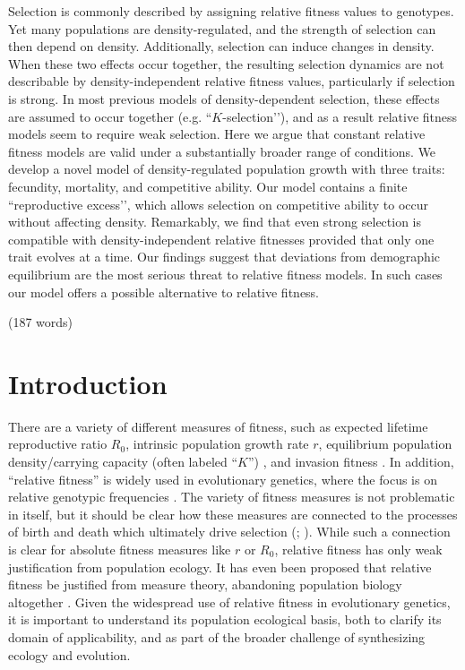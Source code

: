 \documentclass[12pt]{article}
\begin{document}
Selection is commonly described by assigning relative fitness values to genotypes. Yet many populations are density-regulated, and the strength of selection can then depend on density. Additionally, selection can induce changes in density. When these two effects occur together, the resulting selection dynamics are not describable by density-independent relative fitness values, particularly if selection is strong. In most previous models of density-dependent selection, these effects are assumed to occur together (e.g. ``$K$-selection’’), and as a result relative fitness models seem to require weak selection. Here we argue that constant relative fitness models are valid under a substantially broader range of conditions. We develop a novel model of density-regulated population growth with three traits: fecundity, mortality, and competitive ability. Our model contains a finite ``reproductive excess’’, which allows selection on competitive ability to occur without affecting density. Remarkably, we find that even strong selection is compatible with density-independent relative fitnesses provided that only one trait evolves at a time. Our findings suggest that deviations from demographic equilibrium are the most serious threat to relative fitness models. In such cases our model offers a possible alternative to relative fitness. 

\noindent (187 words)

\newpage{}


\section*{Introduction}

There are a variety of different measures of fitness, such as expected lifetime reproductive ratio $R_0$, intrinsic population growth rate $r$, equilibrium population density/carrying capacity (often labeled ``$K$'') \citep{benton_2000}, and invasion fitness \citep{metz_1992}. In addition, ``relative fitness'' is widely used in evolutionary genetics, where the focus is on relative genotypic frequencies \cite[pp. 468]{barton_2007}. The variety of fitness measures is not problematic in itself, but it should be clear how these measures are connected to the processes of birth and death which ultimately drive selection (\citealt{metcalf_2007,doebeli_2017}; \citealt[pp. 178]{charlesworth_1994}). While such a connection is clear for absolute fitness measures like $r$ or $R_0$, relative fitness has only weak justification from population ecology. It has even been proposed that relative fitness be justified from measure theory, abandoning population biology altogether \citep{wagner_2010}. Given the widespread use of relative fitness in evolutionary genetics, it is important to understand its population ecological basis, both to clarify its domain of applicability, and as part of the broader challenge of synthesizing ecology and evolution.
\end{document}
